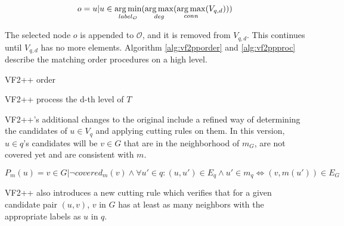 \[ o = {u | u \in \operatorname*{arg\,min}_{label_{\mathcal{O}}}(\operatorname*{arg\,max}_{deg}(\operatorname*{arg\,max}_{conn}(V_{q,d})))} \]

The selected node $o$ is appended to $\mathcal{O}$, and it is removed from $V_{q,d}$. This continues 
until $V_{q,d}$ has no more elements. Algorithm \ref{alg:vf2pporder} and \ref{alg:vf2ppproc} describe
the matching order procedures on a high level.

\begin{algorithm}[h]
    \SetAlgoLined\DontPrintSemicolon
    \label{alg:vf2pporder}
    \caption{VF2++ order}
\end{algorithm}

\begin{algorithm}[h]
    \SetAlgoLined\DontPrintSemicolon
    \label{alg:vf2ppproc}
    \caption{VF2++ process the d-th level of $T$}
\end{algorithm}

VF2++'s additional changes to the original include a refined way of determining the candidates
of $u \in V_q$ and applying cutting rules on them. In this version, $u \in q$'s candidates will be 
$v \in G$ that are in the neighborhood of $m_G$, are not covered yet and are consistent with $m$.

\[ P_m(u) = {v \in G | \neg covered_m(v) \land \forall u' \in q: (u, u') \in E_q \land u' \in m_q \iff (v, m(u')) \in E_G}  \]

VF2++ also introduces a new cutting rule which verifies that for a given candidate pair $(u, v)$,
$v$ in $G$ has at least as many neighbors with the appropriate labels as $u$ in $q$. 

